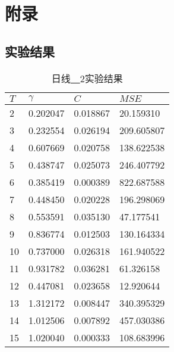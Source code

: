 
\chapter{附录}

\section{实验结果}

\begin{table}[ht]
    \centering
    \caption{日线\underline{~~}2实验结果}
    \begin{tabular}{llll}
        \hline
        $T$&  $\gamma$ &         $C$ &     $MSE$ \\
        \hline
         2 &  0.202047 &  0.018867 &   20.159310 \\
         3 &  0.232554 &  0.026194 &  209.605807 \\
         4 &  0.607669 &  0.020758 &  138.622538 \\
         5 &  0.438747 &  0.025073 &  246.407792 \\
         6 &  0.385419 &  0.000389 &  822.687588 \\
         7 &  0.448450 &  0.020228 &  196.298069 \\
         8 &  0.553591 &  0.035130 &   47.177541 \\
         9 &  0.836774 &  0.012503 &  130.164334 \\
        10 &  0.737000 &  0.026318 &  161.940522 \\
        11 &  0.931782 &  0.036281 &   61.326158 \\
        12 &  0.447081 &  0.023658 &   12.920644 \\
        13 &  1.312172 &  0.008447 &  340.395329 \\
        14 &  1.012506 &  0.007892 &  457.030386 \\
        15 &  1.020040 &  0.000333 &  108.683996 \\
        \hline
    \end{tabular}
\end{table}

